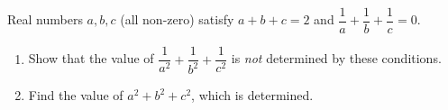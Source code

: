 Real numbers $a,b,c$ (all non-zero) satisfy $a+b+c=2$ and $\dfrac{1}{a}+\dfrac{1}{b}+\dfrac{1}{c}=0$.
\begin{enumerate}
\item[(a)] Show that the value of $\dfrac{1}{a^2}+\dfrac{1}{b^2}+\dfrac{1}{c^2}$ is \emph{not} determined by these conditions.
\item[(b)] Find the value of $a^2+b^2+c^2$, which is determined.
\end{enumerate}
